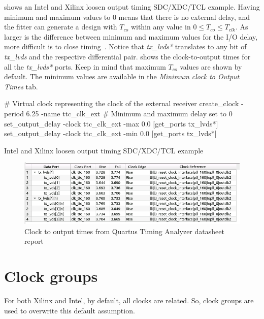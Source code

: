  shows an Intel and Xilinx loosen output timing SDC/XDC/TCL example. Having minimum and maximum values to 0 means that there is no external delay, and the fitter can generate a design with $T_{co}$ within any value in $0 \leq T_{co} \leq T_{clk}$. As larger is the difference between minimum and maximum values for the I/O delay, more difficult is to close timing~\cite{scovilleTimeQuestUserGuide2010}. Notice that \textit{tx\_lvds*} translates to any bit of \textit{tx\_lvds} and the respective differential pair.  shows the clock-to-output times for all the \textit{tx\_lvds*} ports. Keep in mind that maximum $T_{co}$ values are shown by default. The minimum values are available in the \textit{Minimum clock to Output Times} tab. 

\begin{listing}[ht]
\begin{tclcode*}{}
# Virtual clock representing the clock of the external receiver
create_clock -period 6.25 -name ttc_clk_ext
# Minimum and maximum delay set to 0
set_output_delay -clock ttc_clk_ext -max 0.0 [get_ports tx_lvds*]
set_output_delay -clock ttc_clk_ext -min 0.0 [get_ports tx_lvds*]
\end{tclcode*}
\caption{Intel and Xilinx loosen output timing SDC/XDC/TCL example}
\label{listing:outputdelay}
\end{listing}

\begin{figure}[htb]
    \centering
    \includegraphics[width=1\linewidth]{images/quartus/Tcodatasheet-quartus.png}
    \caption{Clock to output times from Quartus Timing Analyzer datasheet report}
    \label{fig:Tcodatasheet-quartus.png}
\end{figure} 




\section{Clock groups}

For both Xilinx and Intel, by default, all clocks are related. So, clock groups are used to overwrite this default assumption.

